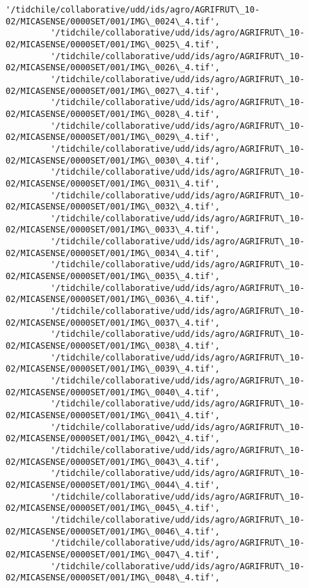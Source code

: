 \documentclass[11pt]{article}
\begin{document}
\begin{Verbatim}[commandchars=\\\{\}]
         '/tidchile/collaborative/udd/ids/agro/AGRIFRUT\_10-02/MICASENSE/0000SET/001/IMG\_0024\_4.tif',
         '/tidchile/collaborative/udd/ids/agro/AGRIFRUT\_10-02/MICASENSE/0000SET/001/IMG\_0025\_4.tif',
         '/tidchile/collaborative/udd/ids/agro/AGRIFRUT\_10-02/MICASENSE/0000SET/001/IMG\_0026\_4.tif',
         '/tidchile/collaborative/udd/ids/agro/AGRIFRUT\_10-02/MICASENSE/0000SET/001/IMG\_0027\_4.tif',
         '/tidchile/collaborative/udd/ids/agro/AGRIFRUT\_10-02/MICASENSE/0000SET/001/IMG\_0028\_4.tif',
         '/tidchile/collaborative/udd/ids/agro/AGRIFRUT\_10-02/MICASENSE/0000SET/001/IMG\_0029\_4.tif',
         '/tidchile/collaborative/udd/ids/agro/AGRIFRUT\_10-02/MICASENSE/0000SET/001/IMG\_0030\_4.tif',
         '/tidchile/collaborative/udd/ids/agro/AGRIFRUT\_10-02/MICASENSE/0000SET/001/IMG\_0031\_4.tif',
         '/tidchile/collaborative/udd/ids/agro/AGRIFRUT\_10-02/MICASENSE/0000SET/001/IMG\_0032\_4.tif',
         '/tidchile/collaborative/udd/ids/agro/AGRIFRUT\_10-02/MICASENSE/0000SET/001/IMG\_0033\_4.tif',
         '/tidchile/collaborative/udd/ids/agro/AGRIFRUT\_10-02/MICASENSE/0000SET/001/IMG\_0034\_4.tif',
         '/tidchile/collaborative/udd/ids/agro/AGRIFRUT\_10-02/MICASENSE/0000SET/001/IMG\_0035\_4.tif',
         '/tidchile/collaborative/udd/ids/agro/AGRIFRUT\_10-02/MICASENSE/0000SET/001/IMG\_0036\_4.tif',
         '/tidchile/collaborative/udd/ids/agro/AGRIFRUT\_10-02/MICASENSE/0000SET/001/IMG\_0037\_4.tif',
         '/tidchile/collaborative/udd/ids/agro/AGRIFRUT\_10-02/MICASENSE/0000SET/001/IMG\_0038\_4.tif',
         '/tidchile/collaborative/udd/ids/agro/AGRIFRUT\_10-02/MICASENSE/0000SET/001/IMG\_0039\_4.tif',
         '/tidchile/collaborative/udd/ids/agro/AGRIFRUT\_10-02/MICASENSE/0000SET/001/IMG\_0040\_4.tif',
         '/tidchile/collaborative/udd/ids/agro/AGRIFRUT\_10-02/MICASENSE/0000SET/001/IMG\_0041\_4.tif',
         '/tidchile/collaborative/udd/ids/agro/AGRIFRUT\_10-02/MICASENSE/0000SET/001/IMG\_0042\_4.tif',
         '/tidchile/collaborative/udd/ids/agro/AGRIFRUT\_10-02/MICASENSE/0000SET/001/IMG\_0043\_4.tif',
         '/tidchile/collaborative/udd/ids/agro/AGRIFRUT\_10-02/MICASENSE/0000SET/001/IMG\_0044\_4.tif',
         '/tidchile/collaborative/udd/ids/agro/AGRIFRUT\_10-02/MICASENSE/0000SET/001/IMG\_0045\_4.tif',
         '/tidchile/collaborative/udd/ids/agro/AGRIFRUT\_10-02/MICASENSE/0000SET/001/IMG\_0046\_4.tif',
         '/tidchile/collaborative/udd/ids/agro/AGRIFRUT\_10-02/MICASENSE/0000SET/001/IMG\_0047\_4.tif',
         '/tidchile/collaborative/udd/ids/agro/AGRIFRUT\_10-02/MICASENSE/0000SET/001/IMG\_0048\_4.tif',

\end{Verbatim}
\end{document}
